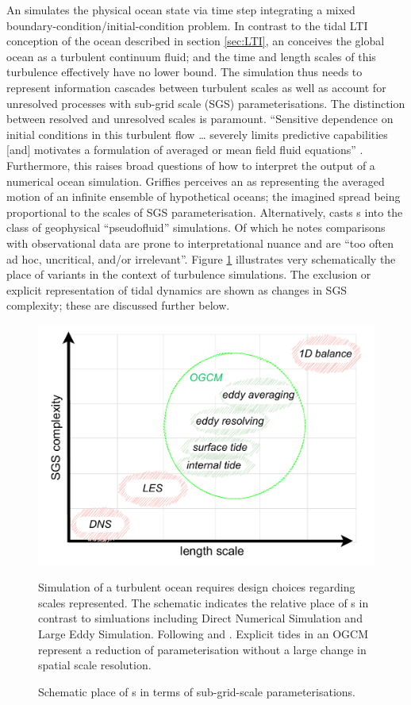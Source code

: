 An \OGCM{} simulates the physical ocean state via time step integrating a mixed boundary-condition/initial-condition problem.
In contrast to the tidal LTI conception of the ocean described in section \ref{sec:LTI}, an \OGCM{} conceives the global ocean as a turbulent continuum fluid; and the time and length scales of this turbulence effectively have no lower bound. The simulation thus needs to represent information cascades between turbulent scales as well as account for unresolved processes with sub-grid scale (SGS) parameterisations.
The distinction between resolved and unresolved scales is paramount.  ``Sensitive dependence on initial conditions in this turbulent flow \dots{} severely limits predictive capabilities [and] motivates a formulation of averaged or mean field fluid equations'' \citep[Sec 2.5]{Griffies:2004vs}.
Furthermore, this raises broad questions of how to interpret the output of a numerical ocean simulation.
Griffies perceives an \OGCM{} as representing the averaged motion of an infinite ensemble of hypothetical oceans; the imagined spread being proportional to the scales of SGS parameterisation.
Alternatively, \citet{Stevens:2001kb} casts \OGCM{}s into the class of geophysical ``pseudofluid'' simulations. Of which he notes comparisons with observational data are prone to interpretational nuance and are ``too often ad hoc, uncritical, and/or irrelevant''\citep[pp 286]{Stevens:2001kb}. 
Figure \ref{fig:ogcmScales} illustrates very schematically the place of \OGCM{} variants in the context of turbulence simulations.   The exclusion or explicit representation of tidal dynamics are shown as changes in SGS complexity; these are discussed further below.
\begin{figure}[!hbt] \centering
  \includegraphics[width=\figwidthBig]{figures/diagrams/ogcm_scales.pdf}
  \caption{Schematic place of \OGCM{}s in terms of sub-grid-scale parameterisations.}
  {Simulation of a turbulent ocean requires design choices regarding scales represented.  The schematic indicates the relative place of \OGCM{}s in contrast to simluations including Direct Numerical Simulation and Large Eddy Simulation. Following \citet[fig 5.2]{Petersen:2012tr} and \citet{Stevens:2001kb}.  Explicit tides in an OGCM represent a reduction of parameterisation without a large change in spatial scale resolution.}
  \label{fig:ogcmScales}
\end{figure}
